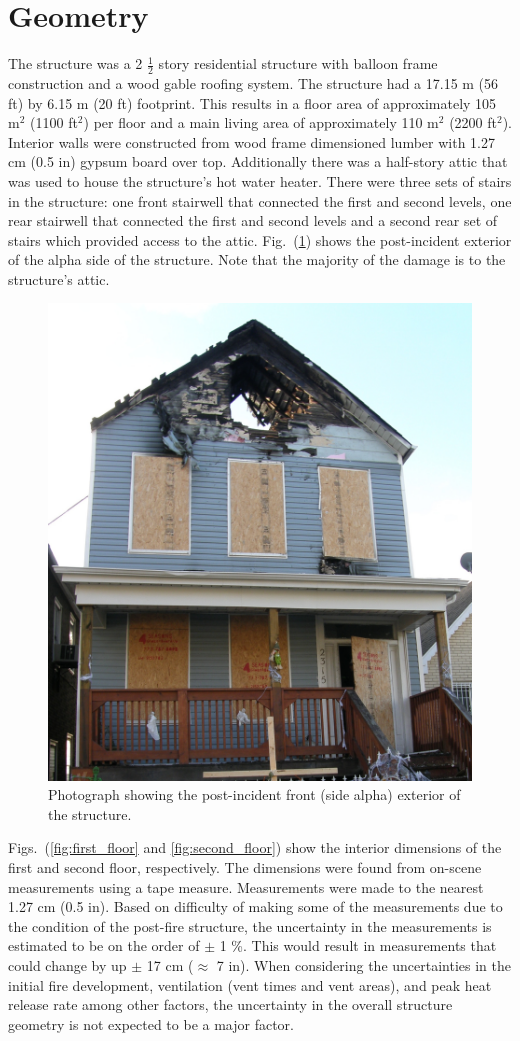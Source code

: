 \documentclass[11pt,oneside]{book}
\begin{document}
\section{Geometry}
\label{geom}
The structure was a 2 $\tfrac{1}{2}$ story residential structure with balloon frame construction and a wood gable roofing system.  The structure had a 17.15 m (56 ft) by 6.15 m (20 ft) footprint. This results in a floor area of approximately 105 m$^2$ (1100 ft$^2$) per floor and a main living area of approximately 110 m$^2$ (2200 ft$^2$). Interior walls were constructed from wood frame dimensioned lumber with 1.27 cm (0.5 in) gypsum board over top. Additionally there was a half-story attic that was used to house the structure's hot water heater. There were three sets of stairs in the structure: one front stairwell that connected the first and second levels, one rear stairwell that connected the first and second levels and a second rear set of stairs which provided access to the attic. Fig.~(\ref{fig:alpha_ex}) shows the post-incident exterior of the alpha side of the structure. Note that the majority of the damage is to the structure's attic.

\begin{figure}[h!]
\centering
\includegraphics[width=.65\textwidth]{../Figures/exterior_alpha}
\caption{Photograph showing the post-incident front (side alpha) exterior of the structure.}
\label{fig:alpha_ex}
\end{figure}

Figs.~(\ref{fig:first_floor} and \ref{fig:second_floor}) show the interior dimensions of the first and second floor, respectively. The dimensions were found from on-scene measurements using a tape measure. Measurements were made to the nearest 1.27 cm (0.5 in). Based on difficulty of making some of the measurements due to the condition of the post-fire structure, the uncertainty in the measurements is estimated to be on the order of $\pm$ 1 \%. This would result in measurements that could change by up $\pm$ 17 cm ($\approx$ 7 in). When considering the uncertainties in the initial fire development, ventilation (vent times and vent areas), and peak heat release rate among other factors, the uncertainty in the overall structure geometry is not expected to be a major factor.
\end{document}
